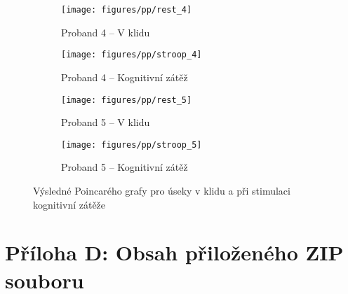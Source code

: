 \begin{figure}[H]\ContinuedFloat 
    \centering
    \begin{subfigure}{0.45\textwidth}
        \centering
        \texttt{[image: figures/pp/rest\_4]}
        \caption{Proband 4 -- V klidu}
    \end{subfigure}
    \hspace{12pt}
    \begin{subfigure}{0.45\textwidth}
        \centering
        \texttt{[image: figures/pp/stroop\_4]}
        \caption{Proband 4 -- Kognitivní zátěž}
    \end{subfigure}
    \par\bigskip
    \begin{subfigure}{0.45\textwidth}
        \centering
        \texttt{[image: figures/pp/rest\_5]}
        \caption{Proband 5 -- V klidu}
    \end{subfigure}
    \hspace{12pt}
    \begin{subfigure}{0.45\textwidth}
        \centering
        \texttt{[image: figures/pp/stroop\_5]}
        \caption{Proband 5 -- Kognitivní zátěž}
    \end{subfigure}
    \caption{Výsledné Poincarého grafy pro úseky v klidu a při stimulaci kognitivní zátěže}
    \label{fig:attachment_poincares_plots}
\end{figure}

\clearpage

\section*{Příloha D: Obsah přiloženého ZIP souboru}
\label{att:data}

